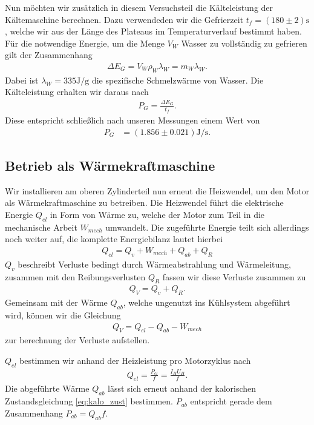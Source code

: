 Nun möchten wir zusätzlich in diesem Versuchsteil die Kälteleistung der Kältemaschine berechnen. Dazu verwendeden wir die Gefrierzeit $t_f = (180 \pm 2)\si{\second}$, welche wir aus der Länge des Plateaus im Temperaturverlauf bestimmt haben. Für die notwendige Energie, um die Menge $V_W$ Wasser zu vollständig zu gefrieren gilt der Zusammenhang
\begin{align}
    \Delta E_G = V_W \rho_W \lambda_W = m_W \lambda_W.
\end{align}
Dabei ist $\lambda_W = 335\si{\joule\per\gram}$ die spezifische Schmelzwärme von Wasser. Die Kälteleistung erhalten wir daraus nach
\begin{align}
    P_G = \frac{\Delta E_G}{t_f}.
\end{align}
Diese entspricht schließlich nach unseren Messungen einem Wert von
\begin{align}
    P_G &= (1.856 \pm 0.021)\si{\joule\per\second}.
\end{align}

\subsection{Betrieb als Wärmekraftmaschine}

Wir installieren am oberen Zylinderteil nun erneut die Heizwendel, um den Motor als Wärmekraftmaschine zu betreiben. Die Heizwendel führt die elektrische Energie $Q_{el}$ in Form von Wärme zu, welche der Motor zum Teil in die mechanische Arbeit $W_{mech}$ umwandelt. Die zugeführte Energie teilt sich allerdings noch weiter auf, die komplette Energiebilanz lautet hierbei
\begin{align}
    Q_{el} = Q_v + W_{mech} + Q_{ab} + Q_R
\end{align}
$Q_v$ beschreibt Verluste bedingt durch Wärmeabstrahlung und Wärmeleitung, zusammen mit den Reibungsverlusten $Q_R$ fassen wir diese Verluste zusammen zu
\begin{align}
    Q_{V} = Q_v + Q_R.
\end{align}
Gemeinsam mit der Wärme $Q_{ab}$, welche ungenutzt ins Kühlsystem abgeführt wird, können wir die Gleichung
\begin{align}
    Q_{V} = Q_{el} - Q_{ab} - W_{mech} \label{eq:Q_V}
\end{align}
zur berechnung der Verluste aufstellen.

$Q_{el}$ bestimmen wir anhand der Heizleistung pro Motorzyklus nach
\begin{align}
    Q_{el} = \frac{P_{el}}{f} = \frac{I_H U_H}{f}.
\end{align}
Die abgeführte Wärme $Q_{ab}$ lässt sich erneut anhand der kalorischen Zustandsgleichung \eqref{eq:kalo_zust} bestimmen. $P_{ab}$ entspricht gerade dem Zusammenhang $P_{ab} = Q_{ab} f$.

